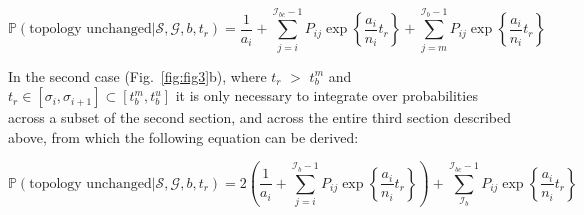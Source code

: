 \documentclass[11pt]{article}
\begin{document}

\begin{equation}
	\mathbb{P}(\textrm{topology unchanged} | \mathcal{S},\mathcal{G},b,t_r) = 
	\frac{1}{a_i} + \sum_{j=i}^{\mathcal{I}_{bc}-1}P_{ij}\exp\left\{\frac{a_i}{n_i}t_r\right\} + 
	\sum_{j=m}^{\mathcal{I}_b-1}P_{ij}\exp\left\{\frac{a_i}{n_i}t_r\right\}
\end{equation}



\noindent In the second case (Fig.~\ref{fig:fig3}b), where $t_r$ $>$ $t_b^m$ and 
$t_r \in [\sigma_i, \sigma_{i+1}] \subset [t_b^m,t_b^u]$ 
it is only necessary to integrate over probabilities across a subset of the 
second section, and across the entire third section described above, from 
which the following equation can be derived:


\begin{equation}
	\mathbb{P}(\textrm{topology unchanged} | \mathcal{S},\mathcal{G},b,t_r) = 
	2\left(\frac{1}{a_i} + \sum_{j=i}^{\mathcal{I}_{b}-1}P_{ij}\exp\left\{\frac{a_i}{n_i}t_r\right\}\right) + 
	\sum_{\mathcal{I}_b}^{\mathcal{I}_{bc}-1}P_{ij}\exp\left\{\frac{a_i}{n_i}t_r\right\}
\end{equation}
\end{document}
